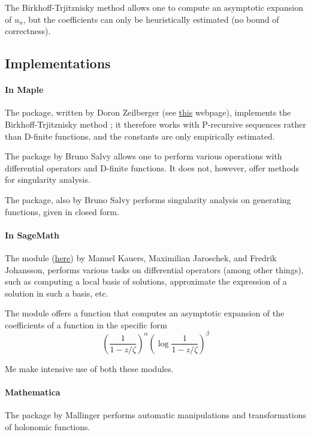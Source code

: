 \documentclass[../main.tex]{subfiles}
\begin{document}
The Birkhoff-Trjitznisky method allows one to compute an asymptotic expansion of $u_n$, but the coefficients can only be heuristically estimated (no bound of correctness).

\subsection*{Implementations}

\paragraph{In Maple}
The  package, written by Doron Zeilberger (see \href{https://sites.math.rutgers.edu/~zeilberg/mamarim/mamarimhtml/asy.html}{this} webpage), implements the Birkhoff-Trjitznisky method ; it therefore works with P-recursive sequences rather than D-finite functions, and the constants are only empirically estimated.

The  package by Bruno Salvy \cite{salvyGFUN} allows one to perform various operations with differential operators and D-finite functions. It does not, however, offer methods for singularity analysis.

The  package, also by Bruno Salvy \cite{Salvy1991ExamplesOA} performs singularity analysis on generating functions, given in closed form.

\paragraph{In SageMath}

The  module (\href{https://github.com/mkauers/ore_algebra}{here}) by Manuel Kauers, Maximilian Jaroschek, and Fredrik Johansson, performs various tasks on differential operators (among other things), such as computing a local basis of solutions, approximate the expression of a solution in such a basis, etc.

The  module offers a function  that computes an asymptotic expansion of the coefficients of a function in the specific form $${\left(\frac{1}{1 - z/\zeta}\right)}^\alpha {\left( \log \frac{1}{1 - z/\zeta} \right)}^\beta$$

Me make intensive use of both these modules.

\paragraph{Mathematica}

The package  by Mallinger performs automatic manipulations and transformations of holonomic functions.
\end{document}
